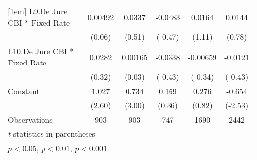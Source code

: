 {\begin{longtable}{l*{5}{c}}
[1em]
L9.De Jure CBI * Fixed Rate&  0.00492         &   0.0337         &  -0.0483         &   0.0164         &   0.0144         \\
                &   (0.06)         &   (0.51)         &  (-0.47)         &   (1.11)         &   (0.78)         \\
[1em]
L10.De Jure CBI * Fixed Rate&   0.0282         &  0.00165         &  -0.0338         & -0.00659         &  -0.0121         \\
                &   (0.32)         &   (0.03)         &  (-0.43)         &  (-0.34)         &  (-0.43)         \\
[1em]
Constant        &    1.027\sym{*}  &    0.734\sym{**} &    0.169         &    0.276         &   -0.654\sym{*}  \\
                &   (2.60)         &   (3.00)         &   (0.36)         &   (0.82)         &  (-2.53)         \\
\hline
Observations    &      903         &      903         &      747         &     1690         &     2442         \\
\hline\hline
\multicolumn{6}{l}{\footnotesize \textit{t} statistics in parentheses}\\
\multicolumn{6}{l}{\footnotesize \sym{*} \(p<0.05\), \sym{**} \(p<0.01\), \sym{***} \(p<0.001\)}\\
\end{longtable}
}
